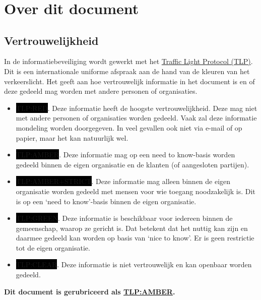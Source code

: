 \documentclass[11pt, a4paper]{report}
\title{ \reporttitle{} }
\author{ \application{} }
\newcommand\tlp{AMBER}
\begin{document}
\maketitle



\chapter{Over dit document}
\section{Vertrouwelijkheid}
In de informatiebeveiliging wordt gewerkt met het
\href{https://www.ncsc.nl/onderwerpen/traffic-light-protocol}{Traffic
Light Protocol (TLP)}. Dit is een internationale uniforme afspraak aan
de hand van de kleuren van het verkeerslicht. Het geeft aan hoe
vertrouwelijk informatie in het document is en of deze gedeeld mag
worden met andere personen of organisaties.

\begin{itemize}
     \item \colorbox{black}{\color{red}TLP:RED}. Deze informatie heeft
de hoogste vertrouwelijkheid. Deze mag niet met andere personen of
organisaties worden gedeeld. Vaak zal deze informatie mondeling worden
doorgegeven. In veel gevallen ook niet via e-mail of op papier, maar het
kan natuurlijk wel.
     \item \colorbox{black}{\color{orange}TLP:AMBER}. Deze informatie
mag op een need to know-basis worden gedeeld binnen de eigen organisatie
en de klanten (of aangesloten partijen).
     \item \colorbox{black}{\color{orange}TLP:AMBER+STRICT}. Deze
informatie mag alleen binnen de eigen organisatie worden gedeeld met
mensen voor wie toegang noodzakelijk is. Dit is op een `need to
know'-basis binnen de eigen organisatie.
     \item \colorbox{black}{\color{green}TLP:GREEN}. Deze informatie is
beschikbaar voor iedereen binnen de gemeenschap, waarop ze gericht is.
Dat betekent dat het nuttig kan zijn en daarmee gedeeld kan worden op
basis van `nice to know'. Er is geen restrictie tot de eigen organisatie.
     \item \colorbox{black}{\color{white}TLP:CLEAR}. Deze informatie is
niet vertrouwelijk en kan openbaar worden gedeeld.
\end{itemize}

\textbf{Dit document is gerubriceerd als \underline{TLP:\tlp}.}
\end{document}

